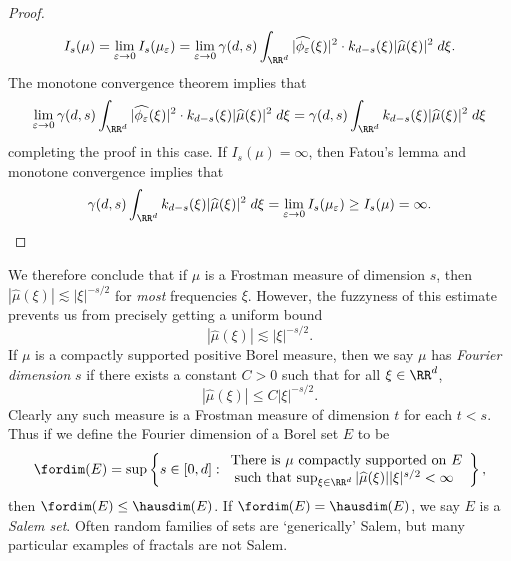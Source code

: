 \begin{proof}
	\[ I_s(\mu) = \lim_{\varepsilon \to 0} I_s(\mu_\varepsilon) = \lim_{\varepsilon \to 0} \gamma(d,s) \int_{\RR^d} |\widehat{\phi_\varepsilon}(\xi)|^2 \cdot k_{d-s}(\xi) |\widehat{\mu}(\xi)|^2\; d\xi. \]
	The monotone convergence theorem implies that
	\[ \lim_{\varepsilon \to 0} \gamma(d,s) \int_{\RR^d} |\widehat{\phi_\varepsilon}(\xi)|^2 \cdot k_{d-s}(\xi) |\widehat{\mu}(\xi)|^2\; d\xi = \gamma(d,s) \int_{\RR^d} k_{d-s}(\xi) |\widehat{\mu}(\xi)|^2\; d\xi  \]
	completing the proof in this case. If $I_s(\mu) = \infty$, then Fatou's lemma and monotone convergence implies that
	\[ \gamma(d,s) \int_{\RR^d} k_{d-s}(\xi) |\widehat{\mu}(\xi)|^2\; d\xi = \lim_{\varepsilon \to 0} I_s(\mu_\varepsilon) \geq I_s(\mu) = \infty. \qedhere \]
\end{proof}

We therefore conclude that if $\mu$ is a Frostman measure of dimension $s$, then $|\widehat{\mu}(\xi)| \lesssim |\xi|^{-s/2}$ for \emph{most} frequencies $\xi$. However, the fuzzyness of this estimate prevents us from precisely getting a uniform bound
%
\[ |\widehat{\mu}(\xi)| \lesssim |\xi|^{-s/2}. \]
%
If $\mu$ is a compactly supported positive Borel measure, then we say $\mu$ has \emph{Fourier dimension} $s$ if there exists a constant $C > 0$ such that for all $\xi \in \RR^d$,
%
\[ |\widehat{\mu}(\xi)| \leq C |\xi|^{-s/2}. \]
%
Clearly any such measure is a Frostman measure of dimension $t$ for each $t < s$. Thus if we define the Fourier dimension of a Borel set $E$ to be
%
\[ \fordim(E) = \sup \left\{ s \in [0,d]: \begin{array}{c}
            \text{There is $\mu$ compactly supported on $E$}\\
             \text{such that $\sup_{\xi \in \RR^d} |\widehat{\mu}(\xi)| |\xi|^{s/2} < \infty$ }
        \end{array} \right\}, \]
%
then $\fordim(E) \leq \hausdim(E)$. If $\fordim(E) = \hausdim(E)$, we say $E$ is a \emph{Salem set}. Often random families of sets are `generically' Salem, but many particular examples of fractals are not Salem.


